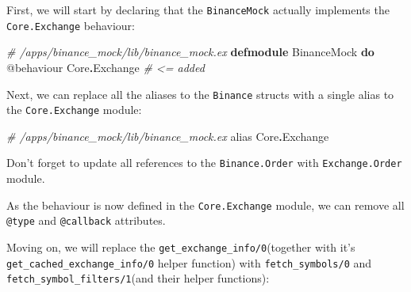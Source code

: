 \documentclass[
  oneside]{book}
\newenvironment{Shaded}{\begin{snugshade}}{\end{snugshade}}
\newcommand{\CommentTok}[1]{\textcolor[rgb]{0.56,0.35,0.01}{\textit{#1}}}
\newcommand{\ConstantTok}[1]{\textcolor[rgb]{0.56,0.35,0.01}{#1}}
\newcommand{\ImportTok}[1]{#1}
\newcommand{\KeywordTok}[1]{\textcolor[rgb]{0.13,0.29,0.53}{\textbf{#1}}}
\newcommand{\OperatorTok}[1]{\textcolor[rgb]{0.81,0.36,0.00}{\textbf{#1}}}
\newcommand{\OtherTok}[1]{\textcolor[rgb]{0.56,0.35,0.01}{#1}}
\begin{document}
First, we will start by declaring that the \texttt{BinanceMock} actually implements the \texttt{Core.Exchange} behaviour:

\begin{Shaded}
\begin{Highlighting}[]
\CommentTok{\# /apps/binance\_mock/lib/binance\_mock.ex}
\KeywordTok{defmodule} \ConstantTok{BinanceMock} \KeywordTok{do}
  \OtherTok{@behaviour} \ConstantTok{Core}\OperatorTok{.}\ConstantTok{Exchange} \CommentTok{\# \textless{}= added}
\end{Highlighting}
\end{Shaded}

Next, we can replace all the aliases to the \texttt{Binance} structs with a single alias to the \texttt{Core.Exchange} module:

\begin{Shaded}
\begin{Highlighting}[]
  \CommentTok{\# /apps/binance\_mock/lib/binance\_mock.ex}
  \ImportTok{alias} \ConstantTok{Core}\OperatorTok{.}\ConstantTok{Exchange}
\end{Highlighting}
\end{Shaded}

Don't forget to update all references to the \texttt{Binance.Order} with \texttt{Exchange.Order} module.

As the behaviour is now defined in the \texttt{Core.Exchange} module, we can remove all \texttt{@type} and \texttt{@callback} attributes.

Moving on, we will replace the \texttt{get\_exchange\_info/0}(together with it's \texttt{get\_cached\_exchange\_info/0} helper function) with \texttt{fetch\_symbols/0} and \texttt{fetch\_symbol\_filters/1}(and their helper functions):
\end{document}

